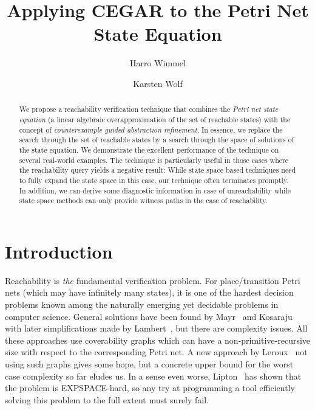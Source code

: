 \documentclass{LMCS}
\begin{document}
\title[Applying CEGAR to the Petri Net State Equation]{Applying CEGAR to the Petri Net State Equation}

\author[H.~Wimmel]{Harro Wimmel} 
\author[K.~Wolf]{Karsten Wolf}

\address{Universit\"at Rostock, Institut f\"ur Informatik}


\begin{abstract}
We propose a reachability verification technique that combines the {\em 
Petri net state equation} (a linear algebraic
overapproximation of the set of reachable states) with the concept of
{\em counterexample guided abstraction refinement}. In essence, we 
replace the search through the set of reachable
states by a search through the space of solutions of the state equation. 
We demonstrate the excellent performance of the
technique on several real-world examples. The technique is particularly 
useful in those cases where the reachability query
yields a negative result: While state space based techniques need to 
fully expand the state space in this case, our
technique often terminates promptly. In addition, we can derive some 
diagnostic information in case of unreachability
while state space methods can only provide witness paths in the case of 
reachability.
\end{abstract}


\maketitle
\enlargethispage*{2\baselineskip}

\section{Introduction}

Reachability is {\em the} fundamental verification problem.
For place/transition Petri nets (which may have infinitely many states), it is one of the hardest decision problems 
known among the naturally emerging yet decidable problems
in computer science. General solutions have been found by
Mayr~\cite{mayr84} and Kosaraju~\cite{kosaraju82} with later simplifications made by Lambert~\cite{lambert92}, but there are
complexity issues. All these approaches use coverability graphs which can have a non-primitive-recursive
size with respect to the corresponding Petri net. A new approach by Leroux~\cite{leroux09} not using
such graphs gives some hope, but a concrete upper bound for the worst case complexity so far
eludes us. In a sense even worse, Lipton~\cite{lipton76} has shown that the problem is {\sf EXPSPACE}-hard,
so any try at programming a tool efficiently solving this problem to the full extent must surely fail.
\end{document}
